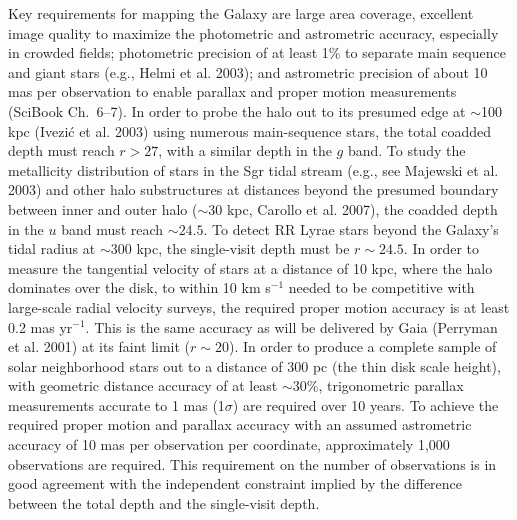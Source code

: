 \documentclass{emulateapj}
\begin{document}
Key requirements for mapping the Galaxy are large area coverage, excellent
image quality to maximize the photometric and astrometric accuracy,
especially in crowded fields; photometric precision of at least 1\% to
separate main sequence and giant stars (e.g., Helmi et al. 2003); and astrometric 
precision of about 10 mas per observation to enable parallax and proper motion measurements
(SciBook Ch.~6--7). 
In order to probe the halo out to its presumed edge at $\sim$100 kpc
(Ivezi\'{c} et al. 2003) using numerous main-sequence stars, the total coadded depth 
must reach $r>27$, with a similar depth in the $g$ band. To study the metallicity distribution of stars 
in the Sgr tidal stream (e.g., see Majewski et al. 2003) and other halo 
substructures at distances beyond the presumed boundary between inner and outer halo 
($\sim$30 kpc, Carollo et al. 2007), the coadded depth in the $u$ band must reach $\sim24.5$. 
To detect RR Lyrae stars beyond the Galaxy's tidal radius at $\sim$300 kpc,
the single-visit depth must be $r\sim24.5$. In order to measure the tangential 
velocity of stars at a distance of 10 kpc, where the halo dominates over the disk, to 
within 10 km s$^{-1}$ needed to be competitive with large-scale radial velocity surveys, 
the required proper motion 
accuracy is at least 0.2 mas yr$^{-1}$. This is the same accuracy as will be delivered
by Gaia (Perryman et al. 2001) at its faint limit ($r\sim20$). In order to produce a complete 
sample of solar neighborhood stars out to a distance of 300 pc (the thin disk scale height), 
with geometric distance accuracy of at least $\sim$30\%,  trigonometric parallax 
measurements accurate to 1 mas (1$\sigma$) are required over 10 years. To achieve the 
required proper motion and parallax accuracy with an assumed astrometric 
accuracy of 10 mas per observation per coordinate, approximately 1,000 
observations are required. This requirement on the number of observations is 
in good agreement with the independent constraint implied by the difference 
between the total depth and the single-visit depth.



\end{document}
